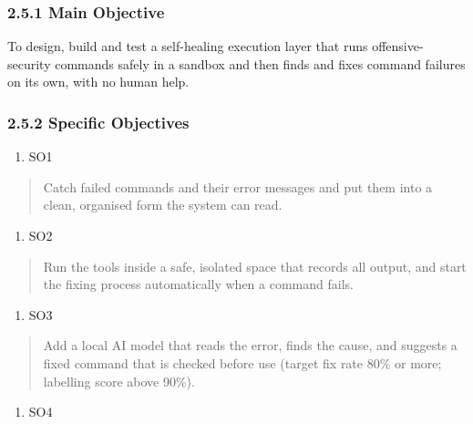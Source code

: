 \documentclass[
]{article}
\begin{document}
\hypertarget{main-objective}{%
\subsubsection{2.5.1 Main Objective}\label{main-objective}}

To design, build and test a self-healing execution layer that runs
offensive-security commands safely in a sandbox and then finds and fixes
command failures on its own, with no human help.

\hypertarget{specific-objectives}{%
\subsubsection{2.5.2 Specific Objectives}\label{specific-objectives}}

\begin{enumerate}
\def\labelenumi{\arabic{enumi}.}
\item
  SO1
\end{enumerate}

\begin{quote}
Catch failed commands and their error messages and put them into a
clean, organised form the system can read.
\end{quote}

\begin{enumerate}
\def\labelenumi{\arabic{enumi}.}
\setcounter{enumi}{1}
\item
  SO2
\end{enumerate}

\begin{quote}
Run the tools inside a safe, isolated space that records all output, and
start the fixing process automatically when a command fails.
\end{quote}

\begin{enumerate}
\def\labelenumi{\arabic{enumi}.}
\setcounter{enumi}{2}
\item
  SO3
\end{enumerate}

\begin{quote}
Add a local AI model that reads the error, finds the cause, and suggests
a fixed command that is checked before use (target fix rate 80\% or
more; labelling score above 90\%).
\end{quote}

\begin{enumerate}
\def\labelenumi{\arabic{enumi}.}
\setcounter{enumi}{3}
\item
  SO4
\end{enumerate}
\end{document}
